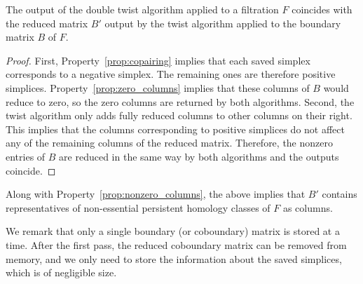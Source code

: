 \begin{prop}
\label{lem:saving}
The output of the double twist algorithm applied to a filtration $F$ coincides with the reduced matrix $B'$ output by the twist algorithm applied to the boundary matrix $B$ of $F$.
\end{prop}
\begin{proof}
First, Property~\ref{prop:copairing} implies that each saved simplex corresponds to a negative simplex. The remaining ones are therefore positive simplices. Property~\ref{prop:zero_columns} implies that these columns of $B$ would reduce to zero, so the zero columns are returned by both algorithms. Second, the twist algorithm only adds fully reduced columns to other columns on their right. This implies that the columns corresponding to positive simplices do not affect any of the remaining columns of the reduced matrix. Therefore, the nonzero entries of $B$ are reduced in the same way by both algorithms and the outputs coincide.
\end{proof}
Along with Property~\ref{prop:nonzero_columns}, the above implies that $B'$ contains representatives of non-essential persistent homology classes of $F$ as columns.

We remark that only a single boundary (or coboundary) matrix is stored at a time. After the first pass, the reduced coboundary matrix can be removed from memory, and we only need to store the information about the saved simplices, which is of negligible size. 

